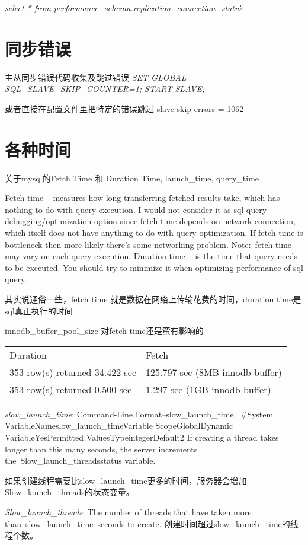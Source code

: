 \textit{select * from performance_schema.replication_connection_status\G}

\section{同步错误}
主从同步错误代码收集及跳过错误
\textit{SET GLOBAL SQL_SLAVE_SKIP_COUNTER=1; START SLAVE; }

或者直接在配置文件里把特定的错误跳过 slave-skip-errors = 1062

\section{各种时间}
关于mysql的Fetch Time 和 Duration Time, launch_time, query_time

Fetch time - measures how long transferring fetched results take, which has nothing to do with query execution. I would not consider it as sql query debugging/optimization option since fetch time depends on network connection, which itself does not have anything to do with query optimization. If fetch time is bottleneck then more likely there's some networking problem.
Note: fetch time may vary on each query execution.
Duration time - is the time that query needs to be executed. You should try to minimize it when optimizing performance of sql query.
 
其实说通俗一些，fetch time 就是数据在网络上传输花费的时间，duration time是sql真正执行的时间

 innodb_buffer_pool_size 对fetch time还是蛮有影响的
 
 \begin{tabular*}{\textwidth}{ll}
                    Duration & Fetch \\
353 row(s) returned 34.422 sec & 125.797 sec (8MB innodb buffer) \\
353 row(s) returned 0.500 sec & 1.297 sec (1GB innodb buffer)
 \end{tabular*}
 
\textit{slow_launch_time}:
Command-Line Format--slow_launch_time=\#System VariableNameslow_launch_timeVariable ScopeGlobalDynamic VariableYesPermitted ValuesTypeintegerDefault2
If creating a thread takes longer than this many seconds, the server increments the Slow_launch_threadsstatus variable.

如果创建线程需要比slow_launch_time更多的时间，服务器会增加Slow_launch_threads的状态变量。

 \textit{Slow_launch_threads}:
 The number of threads that have taken more than slow_launch_time seconds to create.
创建时间超过slow_launch_time的线程个数。

